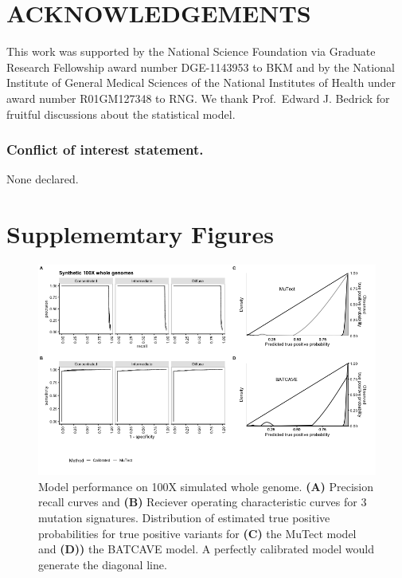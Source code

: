 \documentclass[a4,center,fleqn]{NAR}
\newcommand{\batcave}{BATCAVE }
\newcommand{\beginsupplement}{%
        \clearpage
        \onecolumn
        \setcounter{table}{0}
        \renewcommand{\thetable}{S\arabic{table}}%
        \setcounter{figure}{0}
        \renewcommand{\thefigure}{S\arabic{figure}}%
     }
\begin{document}
\section{ACKNOWLEDGEMENTS}

This work was supported by the National Science Foundation via Graduate Research Fellowship award number DGE-1143953 to BKM and by the National Institute of General Medical Sciences of the National Institutes of Health under award number R01GM127348 to RNG.
We thank Prof.\ Edward J. Bedrick for fruitful discussions about the statistical model.

\subsubsection{Conflict of interest statement.} None declared.



\beginsupplement
\section{Supplememtary Figures}

\begin{figure}[b]
  \begin{center}
  \includegraphics[width=\textwidth]{figures/fig_wgs.png}
  \end{center}
  \caption{Model performance on 100X simulated whole genome.
  \textbf{(A)} Precision recall curves and \textbf{(B)} Reciever operating characteristic curves for 3 mutation signatures.
  Distribution of estimated true positive probabilities for true positive  variants for \textbf{(C)} the MuTect model and \textbf{(D))} the \batcave model.
  A perfectly calibrated model would generate the diagonal line.}
\label{NAR-wgs_fig}
\end{figure}
\end{document}
